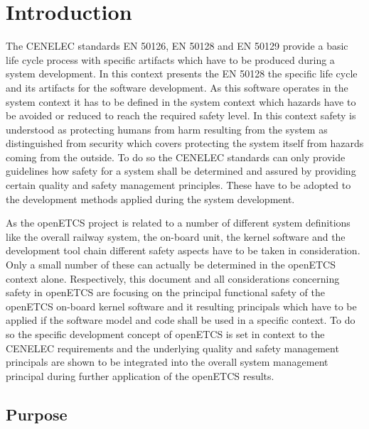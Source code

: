 \documentclass{template/openetcs_report}
\begin{document}

\mainmatter

\chapter{Introduction}
\label{sec:introduction}

 The CENELEC standards EN 50126, EN 50128 and EN 50129 provide a basic life cycle process with specific artifacts which have to be produced during a system development. In this context presents the EN 50128 the specific life cycle and its artifacts for the software development. As this software operates in the system context it has to be defined in the system context which hazards have to be avoided or reduced to reach the required safety level. In this context safety is understood as protecting humans from harm resulting from the system as distinguished from security which covers protecting the system itself from hazards coming from the outside. To  do so the CENELEC standards can only provide guidelines how safety for a system shall be determined and assured by providing certain quality and safety management principles. These have to be adopted to the development methods applied during the system development. 
 
 As the openETCS project is related to a number of different system definitions like the overall railway system, the on-board unit, the kernel software and the development tool chain different safety aspects have to be taken in consideration. Only a small number of these can actually be determined in the openETCS context alone. Respectively, this document and all considerations concerning safety in openETCS are focusing on the principal functional safety of the openETCS on-board kernel software and it resulting principals which have to be applied if the software model and code shall be used in a specific context. To do so the specific development concept of openETCS is set in context to the CENELEC requirements and the underlying quality and safety management principals are shown to be integrated into the overall system management principal during further application of the openETCS results.


\section{Purpose}
\label{sec:purpose}
\end{document}
